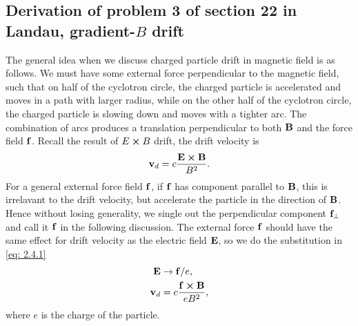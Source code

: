 \documentclass[10pt]{article}
\begin{document}
\subsection{Derivation of problem 3 of section 22 in Landau, gradient-$B$ drift}
The general idea when we discuss charged particle drift in magnetic field is as follows. We must have some external force perpendicular to the magnetic field, such that on half of the cyclotron circle, the charged particle is accelerated and moves in a path with larger radius, while on the other half of the cyclotron circle, the charged particle is slowing down and moves with a tighter arc. The combination of arcs produces a translation perpendicular to both $\vb{B}$ and the force field $\vb{f}$. Recall the result of $E \cross B$ drift, the drift velocity is
\begin{equation}
	\vb{v}_d = c \frac{\vb{E} \cross \vb{B}}{B^2}. \label{eq: 2.4.1}
\end{equation}
For a general external force field $\vb{f}$, if $\vb{f}$ has component parallel to $\vb{B}$, this is irrelavant to the drift velocity, but accelerate the particle in the direction of $\vb{B}$. Hence without losing generality, we single out the perpendicular component $\vb{f}_{\perp}$ and call it $\vb{f}$ in the following discussion. The external force $\vb{f}$ should have the same effect for drift velocity as the electric field $\vb{E}$, so we do the substitution in \eqref{eq: 2.4.1}
\begin{align}
	\vb{E} &\to \vb{f}/e, \\
	\vb{v}_d &= c \frac{\vb{f} \cross \vb{B}}{e B^2}, \label{eq: 2.4.3}
\end{align}
where $e$ is the charge of the particle.
\end{document}
